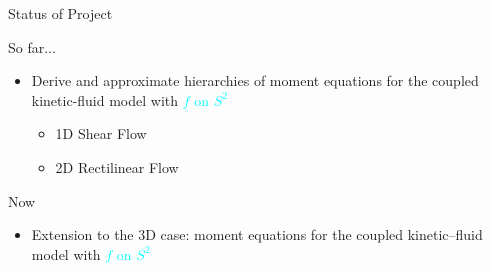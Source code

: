 
\begin{frame}{Status of Project}
	\scriptsize
	\begin{block}{So far...}
		\begin{itemize}
		   \item <1-> Derive and approximate hierarchies of moment equations for the coupled kinetic-fluid model with \textcolor{cyan}{$f$ on $S^2$}
		   \begin{itemize}
			  \item  1D Shear Flow
		  	  \item  2D Rectilinear Flow
		   \end{itemize}
		\end{itemize}
	\end{block}
	\begin{block}{Now}
		\begin{itemize}
			\item <2-> Extension to the 3D case: moment equations for the coupled kinetic–fluid model with \textcolor{cyan}{$f$ on $S^2$}
		\end{itemize}
	\end{block}
\end{frame}

